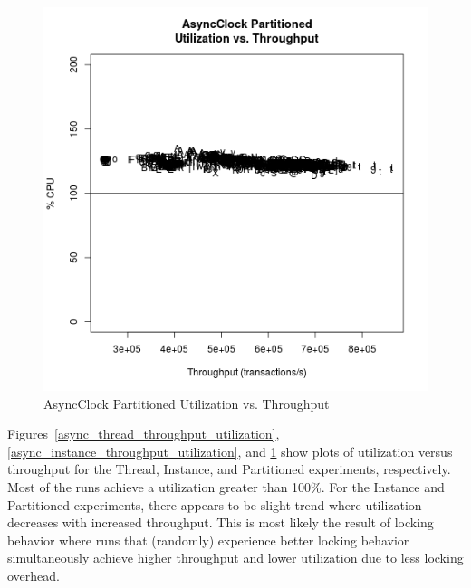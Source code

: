 \begin{figure}[H]
\center
\includegraphics[height=.4\textheight]{async_partitioned_throughput_utilization.png}
\caption{AsyncClock Partitioned Utilization vs. Throughput}
\label{async_partitioned_throughput_utilization}
\end{figure}

Figures~\ref{async_thread_throughput_utilization}, \ref{async_instance_throughput_utilization}, and \ref{async_partitioned_throughput_utilization} show plots of utilization versus throughput for the Thread, Instance, and Partitioned experiments, respectively.
Most of the runs achieve a utilization greater than 100\%.
For the Instance and Partitioned experiments, there appears to be slight trend where utilization decreases with increased throughput.
This is most likely the result of locking behavior where runs that (randomly) experience better locking behavior simultaneously achieve higher throughput and lower utilization due to less locking overhead.

